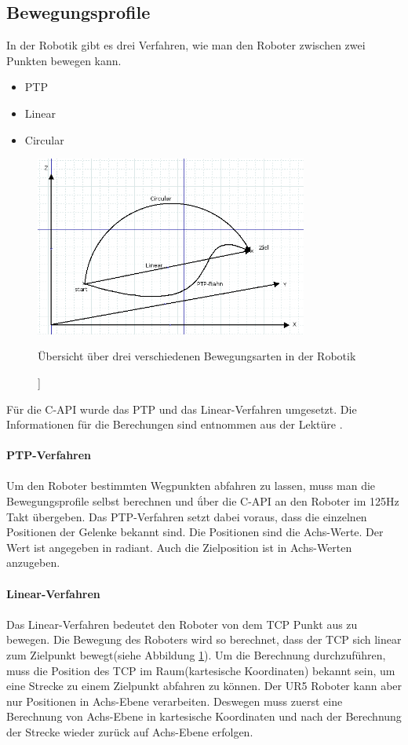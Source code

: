 \subsection{Bewegungsprofile}
\label{sub:bewegungsprofile_gru}

In der Robotik gibt es drei Verfahren, wie man den Roboter zwischen zwei Punkten bewegen kann. 

\begin{itemize}
\item \ac{PTP}
\item Linear
\item Circular
\end{itemize}

\begin{figure}[H]
  \centering
    \includegraphics[width=0.8\textwidth]{pic/bewegungsarten.png}
      \caption[Bewegungsarten in Robotik]]{Übersicht über drei verschiedenen Bewegungsarten in der Robotik}
      \label{fig:bewegungsarten}
\end{figure}

Für die C-\ac{API} wurde das \ac{PTP} und das Linear-Verfahren umgesetzt. Die Informationen für die Berechungen sind entnommen aus der Lektüre \cite{WW-2013}.
\\\\
\textbf{\acs{PTP}-Verfahren}
\\\\
Um den Roboter bestimmten Wegpunkten abfahren zu lassen, muss man die Bewegungsprofile selbst berechnen und ǘber die C-API an den Roboter im 125Hz Takt übergeben. Das \ac{PTP}-Verfahren setzt dabei voraus, dass die einzelnen Positionen der Gelenke bekannt sind. Die Positionen sind die Achs-Werte. Der Wert ist angegeben in radiant. Auch die Zielposition ist in Achs-Werten anzugeben.
\\\\
\textbf{Linear-Verfahren}
\\\\
Das Linear-Verfahren bedeutet den Roboter von dem \ac{TCP} Punkt aus zu bewegen. Die Bewegung des Roboters wird so berechnet, dass der \ac{TCP} sich linear zum Zielpunkt bewegt(siehe Abbildung \ref{fig:bewegungsarten}).
Um die Berechnung durchzuführen, muss die Position des \ac{TCP} im Raum(kartesische Koordinaten) bekannt sein, um eine Strecke zu einem Zielpunkt abfahren zu können. Der UR5 Roboter kann aber nur Positionen in Achs-Ebene verarbeiten. Deswegen muss zuerst eine Berechnung von Achs-Ebene in kartesische Koordinaten und nach der Berechnung der Strecke wieder zurück auf Achs-Ebene erfolgen.


